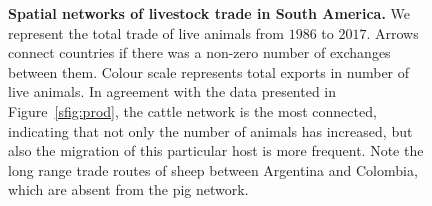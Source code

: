 \documentclass[a4paper,10pt]{article}
\begin{document}
\begin{center}
\begin{figure}[H]
\begin{center}
\end{center}
\caption{
\textbf{Spatial networks of livestock trade in South America.}
We represent the total trade of live animals from $1986$ to $2017$.
Arrows connect countries if there was a non-zero number of exchanges between them.
Colour scale represents total exports in number of live animals.
In agreement with the data presented in Figure~\ref{sfig:prod}, the cattle network is the most connected, indicating that not only the number of animals has increased, but also the migration of this particular host is more frequent. 
Note the long range trade routes of sheep between Argentina and Colombia, which are absent from the pig network.
}
\label{sfig:tradenets}
\end{figure}
\end{center}
\newpage
\end{document}
